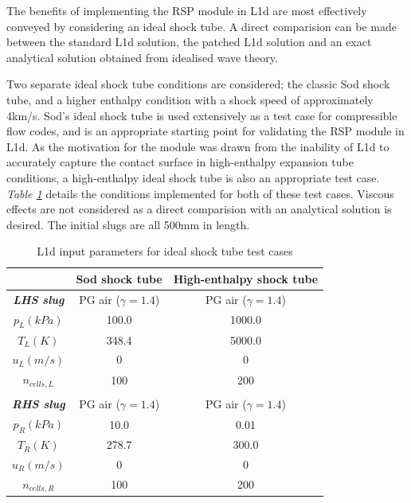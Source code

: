 \documentclass[a4paper,10pt]{article}
\begin{document}
The benefits of implementing the RSP module in L1d are most effectively conveyed by considering an ideal shock tube.  A direct comparision can be made between the standard L1d solution, the patched L1d solution and an exact analytical solution obtained from idealised wave theory.

\par \medskip

Two separate ideal shock tube conditions are considered; the classic Sod shock tube, and a higher enthalpy condition with a shock speed of approximately 4km/s.  Sod's ideal shock tube \cite{sod} is used extensively as a test case for compressible flow codes, and is an appropriate starting point for validating the RSP module in L1d.  As the motivation for the module was drawn from the inability of L1d to accurately capture the contact surface in high-enthalpy expansion tube conditions, a high-enthalpy ideal shock tube is also an appropriate test case.  \emph{Table \ref{table:ideal_cases}} details the conditions implemented for both of these test cases.  Viscous effects are not considered as a direct comparision with an analytical solution is desired.  The initial slugs are all 500mm in length.

\par \medskip

\begin{table}[tbh]
\begin{center}  %
\begin{tabular*}{0.8\textwidth}%
     {@{\extracolsep{\fill}}ccc}
\hline \hline  & \textbf{Sod shock tube} & \textbf{High-enthalpy shock tube} \\
\hline \textbf{\emph{LHS slug}} & PG air ($\gamma=1.4$) & PG air ($\gamma=1.4$) \\
$p_{L} (kPa)$     &         100.0         &           1000.0      \\
$T_{L} (K)$       &         348.4         &           5000.0      \\
$u_{L} (m/s)$     &           0           &             0         \\
$n_{cells,L}$     &         100           &            200        \\
\\
\textbf{\emph{RHS slug}} & PG air ($\gamma=1.4$) & PG air ($\gamma=1.4$)   \\
$p_{R} (kPa)$     &         10.0          &           0.01        \\
$T_{R} (K)$       &         278.7         &           300.0      \\
$u_{R} (m/s)$     &           0           &             0         \\
$n_{cells,R}$     &         100           &            200        \\
\hline
\end{tabular*}
\caption{L1d input parameters for ideal shock tube test cases} \label{table:ideal_cases}
\end{center}
\end{table}
\end{document}
